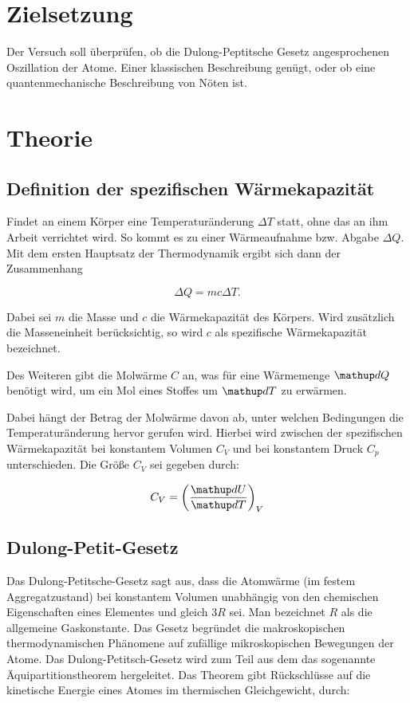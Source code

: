 \section*{Zielsetzung}
Der Versuch soll überprüfen, ob die Dulong-Peptitsche Gesetz
angesprochenen Oszillation der Atome. Einer klassischen Beschreibung genügt,
oder ob eine quantenmechanische Beschreibung von Nöten ist.


\section{Theorie}

\subsection{Definition der spezifischen Wärmekapazität}

Findet an einem Körper eine Temperaturänderung $\Delta T$ statt, ohne das an ihm 
Arbeit verrichtet wird. So kommt es zu einer Wärmeaufnahme bzw. Abgabe $\Delta Q$.
Mit dem ersten Hauptsatz der Thermodynamik ergibt sich dann der Zusammenhang

\begin{equation*}
\Delta Q=m c \Delta T.
\end{equation*}

Dabei sei $m$ die Masse und $c$ die Wärmekapazität 
des Körpers.
Wird zusätzlich die Masseneinheit berücksichtig,
so wird $c$ als spezifische Wärmekapazität bezeichnet.

Des Weiteren gibt die Molwärme $C$
an, was für eine Wärmemenge $\map{d}Q$ benötigt wird,
um ein Mol eines Stoffes um $\map{d}T$ zu erwärmen.

Dabei hängt der Betrag der Molwärme davon ab, unter welchen Bedingungen 
die Temperaturänderung hervor gerufen wird.
Hierbei wird zwischen der spezifischen Wärmekapazität bei konstantem
Volumen $C_{V}$ und bei konstantem Druck $C_{p}$ unterschieden.
Die Größe $C_{V}$ sei gegeben durch:

\begin{equation}
\label{eq:molwarme}
C_V=\left(\frac{\map{d}U}{\map{d}T}\right)_V
\end{equation}


\subsection{Dulong-Petit-Gesetz}

Das Dulong-Petitsche-Gesetz sagt aus, dass die Atomwärme (im festem Aggregatzustand) bei 
konstantem Volumen unabhängig von den chemischen Eigenschaften eines Elementes 
und gleich $3R$ sei.
Man bezeichnet $R$ als die allgemeine Gaskonstante.
Das Gesetz begründet die makroskopischen thermodynamischen Phänomene 
auf zufällige mikroskopischen Bewegungen der Atome.
Das Dulong-Petitsch-Gesetz wird zum Teil aus dem 
das sogenannte Äquipartitionstheorem hergeleitet. 
Das Theorem gibt Rückschlüsse auf die kinetische Energie eines Atomes
im thermischen Gleichgewicht, durch:

